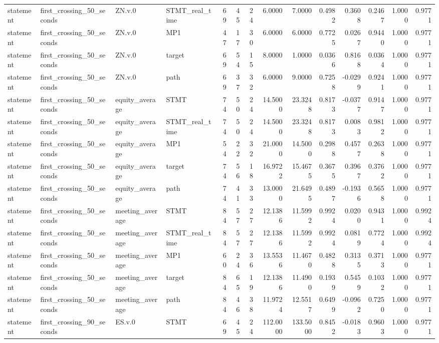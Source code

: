 \begin{tabular}{llllrrrrrrrrrr}
statement & first_crossing_50_seconds & ZN.v.0 & STMT_real_time & 69 & 45 & 24 & 6.0000 & 7.0000 & 0.4982 & 0.3608 & 0.2467 & 1.0000 & 0.9771 \\
statement & first_crossing_50_seconds & ZN.v.0 & MP1 & 47 & 17 & 30 & 6.0000 & 6.0000 & 0.7725 & 0.0267 & 0.9440 & 1.0000 & 0.9771 \\
statement & first_crossing_50_seconds & ZN.v.0 & target & 69 & 54 & 15 & 8.0000 & 1.0000 & 0.0366 & 0.8168 & 0.0364 & 1.0000 & 0.9771 \\
statement & first_crossing_50_seconds & ZN.v.0 & path & 69 & 37 & 32 & 6.0000 & 9.0000 & 0.7258 & -0.0299 & 0.9241 & 1.0000 & 0.9771 \\
statement & first_crossing_50_seconds & equity_average & STMT & 74 & 50 & 24 & 14.5000 & 23.3248 & 0.8173 & -0.0377 & 0.9147 & 1.0000 & 0.9771 \\
statement & first_crossing_50_seconds & equity_average & STMT_real_time & 74 & 50 & 24 & 14.5000 & 23.3248 & 0.8173 & 0.0083 & 0.9812 & 1.0000 & 0.9771 \\
statement & first_crossing_50_seconds & equity_average & MP1 & 54 & 22 & 32 & 21.0000 & 14.5000 & 0.2988 & 0.4577 & 0.2638 & 1.0000 & 0.9771 \\
statement & first_crossing_50_seconds & equity_average & target & 74 & 56 & 18 & 16.9722 & 15.4675 & 0.3675 & 0.3967 & 0.3762 & 1.0000 & 0.9771 \\
statement & first_crossing_50_seconds & equity_average & path & 74 & 41 & 33 & 13.0000 & 21.6495 & 0.4897 & -0.1936 & 0.5658 & 1.0000 & 0.9771 \\
statement & first_crossing_50_seconds & meeting_average & STMT & 84 & 57 & 27 & 12.1386 & 11.5992 & 0.9924 & 0.0200 & 0.9431 & 1.0000 & 0.9924 \\
statement & first_crossing_50_seconds & meeting_average & STMT_real_time & 84 & 57 & 27 & 12.1386 & 11.5992 & 0.9924 & 0.0819 & 0.7724 & 1.0000 & 0.9924 \\
statement & first_crossing_50_seconds & meeting_average & MP1 & 60 & 24 & 36 & 13.5536 & 11.4670 & 0.4828 & 0.3135 & 0.3713 & 1.0000 & 0.9771 \\
statement & first_crossing_50_seconds & meeting_average & target & 84 & 65 & 19 & 12.1386 & 11.4900 & 0.1939 & 0.5459 & 0.1032 & 1.0000 & 0.9771 \\
statement & first_crossing_50_seconds & meeting_average & path & 84 & 46 & 38 & 11.9724 & 12.5517 & 0.6499 & -0.0962 & 0.7250 & 1.0000 & 0.9771 \\
statement & first_crossing_90_seconds & ES.v.0 & STMT & 69 & 45 & 24 & 112.0000 & 133.5000 & 0.8452 & -0.0183 & 0.9603 & 1.0000 & 0.9771 \\

\end{tabular}
